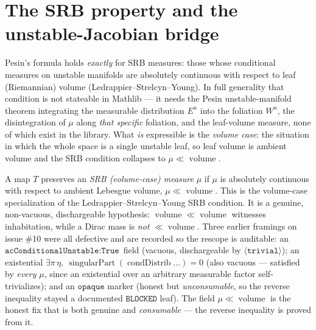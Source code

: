 \section{The SRB property and the unstable-Jacobian bridge}

Pesin's formula holds \emph{exactly} for SRB measures: those whose conditional measures on unstable
manifolds are absolutely continuous with respect to leaf (Riemannian) volume
(Ledrappier--Strelcyn--Young). In full generality that condition is not stateable in Mathlib --- it
needs the Pesin unstable-manifold theorem integrating the measurable distribution \(E^u\) into the
foliation \(W^u\), the disintegration of \(\mu\) along \emph{that specific} foliation, and the
leaf-volume measure, none of which exist in the library. What \emph{is} expressible is the
\emph{volume case}: the situation in which the whole space is a single unstable leaf, so leaf volume
is ambient volume and the SRB condition collapses to \(\mu\ll\operatorname{volume}\).

\begin{definition}\label{SRBProperty}
  \leanok
  A map \(T\) preserves an \emph{SRB (volume-case) measure} \(\mu\) if \(\mu\) is absolutely
  continuous with respect to ambient Lebesgue volume, \(\mu\ll\operatorname{volume}\). This is the
  volume-case specialization of the Ledrappier--Strelcyn--Young SRB condition. It is a genuine,
  non-vacuous, dischargeable hypothesis: \(\operatorname{volume}\ll\operatorname{volume}\) witnesses
  inhabitation, while a Dirac mass is \emph{not} \(\ll\operatorname{volume}\). Three earlier
  framings on issue \#10 were all defective and are recorded so the rescope is auditable: an
  \(\texttt{acConditionalUnstable}:\texttt{True}\) field (vacuous, dischargeable by
  \(\langle\texttt{trivial}\rangle\)); an existential
  \(\exists\pi\,\eta,\ \operatorname{singularPart}(\operatorname{condDistrib}\dots)=0\) (also
  vacuous --- satisfied by \emph{every} \(\mu\), since an existential over an arbitrary measurable
  factor self-trivializes); and an \(\texttt{opaque}\) marker (honest but \emph{unconsumable}, so
  the reverse inequality stayed a documented \(\texttt{BLOCKED}\) leaf). The field
  \(\mu\ll\operatorname{volume}\) is the honest fix that is both genuine and \emph{consumable} ---
  the reverse inequality is proved from it.
\end{definition}

